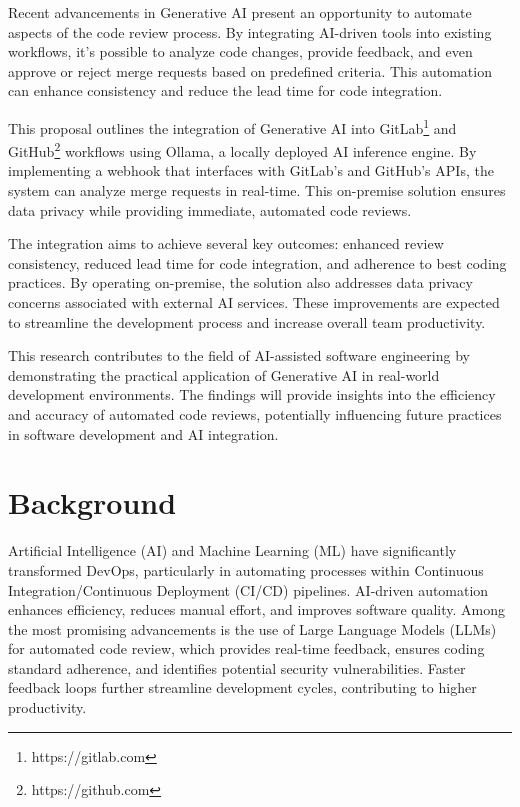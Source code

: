 \documentclass[12pt]{article}
\begin{document}
Recent advancements in Generative AI present an opportunity to automate aspects of the code review process. By integrating AI-driven tools into existing workflows, it's possible to analyze code changes, provide feedback, and even approve or reject merge requests based on predefined criteria. This automation can enhance consistency and reduce the lead time for code integration.
\cite{aiDrivenAgile}

This proposal outlines the integration of Generative AI into GitLab\footnote{https://gitlab.com} and GitHub\footnote{https://github.com} workflows using Ollama\cite{ollama}, a locally deployed AI inference engine. By implementing a webhook that interfaces with GitLab's and GitHub's APIs, the system can analyze merge requests in real-time. This on-premise solution ensures data privacy while providing immediate, automated code reviews.

The integration aims to achieve several key outcomes: enhanced review consistency, reduced lead time for code integration, and adherence to best coding practices. By operating on-premise, the solution also addresses data privacy concerns associated with external AI services. These improvements are expected to streamline the development process and increase overall team productivity.

This research contributes to the field of AI-assisted software engineering by demonstrating the practical application of Generative AI in real-world development environments. The findings will provide insights into the efficiency and accuracy of automated code reviews, potentially influencing future practices in software development and AI integration.

\section{Background}

Artificial Intelligence (AI) and Machine Learning (ML) have significantly transformed DevOps, particularly in automating processes within Continuous Integration/Continuous Deployment (CI/CD) pipelines. AI-driven automation enhances efficiency, reduces manual effort, and improves software quality. Among the most promising advancements is the use of Large Language Models (LLMs) for automated code review, which provides real-time feedback, ensures coding standard adherence, and identifies potential security vulnerabilities. Faster feedback loops further streamline development cycles, contributing to higher productivity. \cite{AIDrivenDevops}
\end{document}
